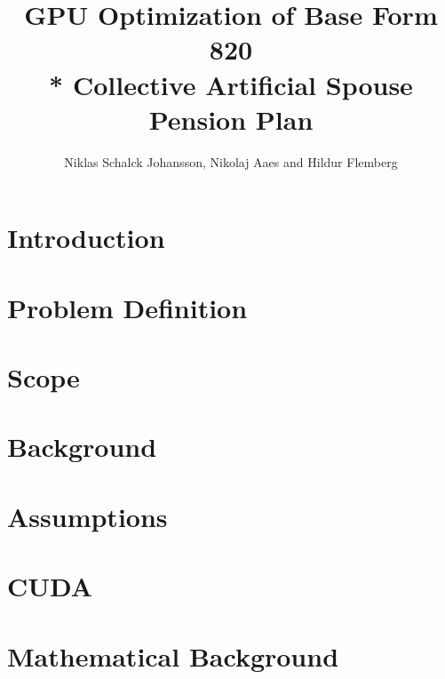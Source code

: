 \documentclass[oribibl]{llncs}
\title{GPU Optimization of Base Form 820 \\* Collective Artificial Spouse Pension Plan}
\author{Niklas Schalck Johansson, Nikolaj Aaes and Hildur Flemberg\\
\email{\{nsjo, niaa, hufl\}@itu.dk}}
\institute{IT University of Copenhagen}
\numberwithin{equation}{section}
\begin{document}
	\maketitle
	\tableofcontents
	\pagebreak
	
	
	\begin{abstract}
		
		\label{abstract}
	\end{abstract}
	
	\section{Introduction}
	
	\label{introduction}
	
	\section{Problem Definition}
	
	\label{problemdefinition}

	\section{Scope}
	
	\label{scope}
		
	\section{Background}
	
	\label{background}
	
	\section{Assumptions}
	
	\label{assumptions}
	
	\section{CUDA}
	
	\label{cuda}
	
	\section{Mathematical Background}
	
		
\end{document}
